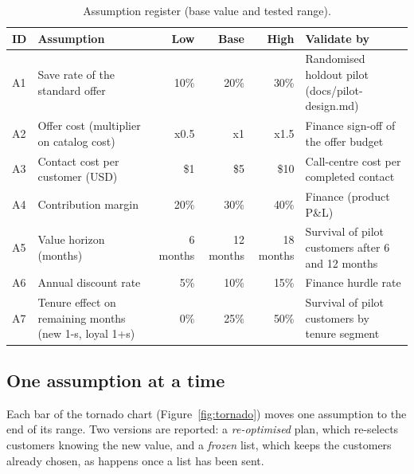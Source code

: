 \documentclass[11pt,a4paper]{article}
\begin{document}
\begin{table}[H]
\centering\small
\caption{Assumption register (base value and tested range).}\label{tab:register}
\begin{tabularx}{\linewidth}{@{}p{0.6cm}Lrrrp{4.4cm}@{}}
\toprule
\textbf{ID} & \textbf{Assumption} & \textbf{Low} & \textbf{Base} & \textbf{High} & \textbf{Validate by} \\
\midrule
A1 & Save rate of the standard offer & 10\% & 20\% & 30\% & Randomised holdout pilot (docs/pilot-design.md) \\
A2 & Offer cost (multiplier on catalog cost) & x0.5 & x1 & x1.5 & Finance sign-off of the offer budget \\
A3 & Contact cost per customer (USD) & \$1 & \$5 & \$10 & Call-centre cost per completed contact \\
A4 & Contribution margin & 20\% & 30\% & 40\% & Finance (product P\&L) \\
A5 & Value horizon (months) & 6 months & 12 months & 18 months & Survival of pilot customers after 6 and 12 months \\
A6 & Annual discount rate & 5\% & 10\% & 15\% & Finance hurdle rate \\
A7 & Tenure effect on remaining months (new 1-s, loyal 1+s) & 0\% & 25\% & 50\% & Survival of pilot customers by tenure segment \\
\bottomrule
\end{tabularx}
\end{table}

\subsection{One assumption at a time}

Each bar of the tornado chart (Figure~\ref{fig:tornado}) moves one assumption to the end of its range. Two versions are reported: a \emph{re-optimised} plan, which re-selects customers knowing the new value, and a \emph{frozen} list, which keeps the customers already chosen, as happens once a list has been sent.
\end{document}

